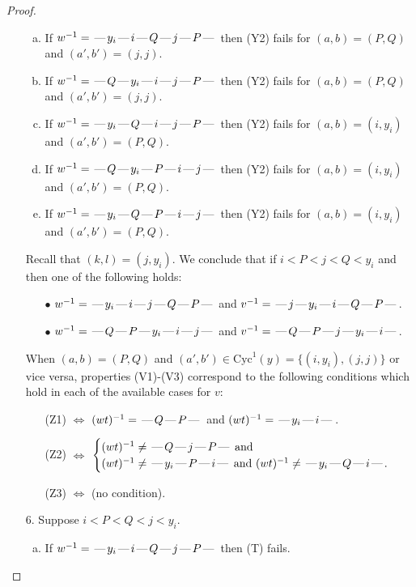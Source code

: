 \documentclass[10pt]{article}
\theoremstyle{definition}
\theoremstyle{definition}
\def\dash{\text{\hspace{0.5mm}---\hspace{0.5mm}}}
\def\Cyc{\mathrm{Cyc}}
\begin{document}
\begin{proof}
\begin{enumerate}
\begin{enumerate}[(a)]
\item If $w^{-1} = \dash y_i\dash i\dash Q\dash j\dash P\dash $ then (Y2) fails for $(a,b)=(P,Q)$ and $(a',b')=(j,j)$.
\item If $w^{-1} = \dash Q\dash y_i\dash i\dash j\dash P\dash $ then (Y2) fails for $(a,b)=(P,Q)$ and $(a',b')=(j,j)$.
\item If $w^{-1} = \dash y_i\dash Q\dash i\dash j\dash P\dash $ then (Y2) fails for $(a,b)=(i,y_i)$ and $(a',b')=(P,Q)$.
\item If $w^{-1} = \dash Q\dash y_i\dash P\dash i\dash j\dash $ then (Y2) fails for $(a,b)=(i,y_i)$ and $(a',b')=(P,Q)$.
\item If $w^{-1} = \dash y_i\dash Q\dash P\dash i\dash j\dash $ then (Y2) fails for $(a,b)=(i,y_i)$ and $(a',b')=(P,Q)$.
\end{enumerate}
Recall that $(k,l) = (j,y_i)$.
We conclude that if $i < P < j < Q < y_i$ and then one of the following holds:
\begin{enumerate}
\item[$\bullet$] $w^{-1} = \dash y_i\dash i\dash j\dash Q\dash P\dash $ and $v^{-1} = \dash j\dash y_i\dash i\dash Q\dash P\dash $.
\item[$\bullet$] $w^{-1} = \dash Q\dash P\dash y_i\dash i\dash j\dash $ and $v^{-1} = \dash Q\dash P\dash j\dash y_i\dash i\dash $.
\end{enumerate}
When $(a,b)= (P,Q)$ and $(a',b')\in \Cyc^1(y)=\{(i,y_i),(j,j)\}$ or vice versa,
properties (V1)-(V3) correspond to the following conditions which hold in
each of the available cases for $v$:
\begin{enumerate}
\item[](Z1) $\Leftrightarrow$ $(wt)^{-1} = \dash Q \dash P \dash$  and $(wt)^{-1} = \dash y_i \dash i \dash$.
\item[](Z2) $\Leftrightarrow$ $\begin{cases}\text{$(wt)^{-1} \neq \dash Q \dash j \dash P \dash$}\text{ and }\\
\text{$(wt)^{-1} \neq \dash y_i \dash P \dash i \dash$ and $(wt)^{-1}\neq \dash y_i \dash Q \dash i \dash$}.\end{cases}$
\item[](Z3) $\Leftrightarrow$ (no condition).
\end{enumerate}
\item[$6$.] Suppose $i < P < Q < j < y_i$.
\begin{enumerate}[(a)]
\item If $w^{-1} = \dash y_i\dash i\dash Q\dash j\dash P\dash $ then (T) fails.

\end{enumerate}
\end{enumerate}
\end{proof}
\end{document}
